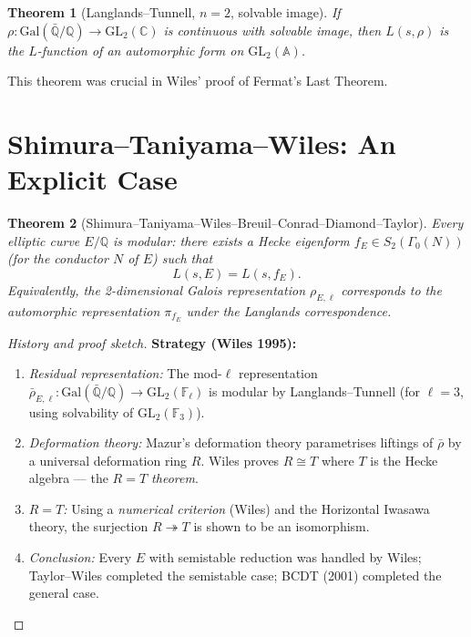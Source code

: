 \documentclass[12pt,a4paper]{amsart}
\newtheorem{theorem}{Theorem}[section]
\theoremstyle{definition}
\newcommand{\Q}{\mathbb{Q}}
\newcommand{\C}{\mathbb{C}}
\newcommand{\F}{\mathbb{F}}
\newcommand{\A}{\mathbb{A}}
\newcommand{\GL}{\mathrm{GL}}
\newcommand{\GQ}{\mathrm{Gal}(\bar{\Q}/\Q)}
\begin{document}
\begin{theorem}[Langlands--Tunnell, $n = 2$, solvable image]
\label{thm:langlands_tunnell}
If $\rho : \GQ \to \GL_2(\C)$ is continuous with solvable image, then
$L(s, \rho)$ is the $L$-function of an automorphic form on $\GL_2(\A)$.
\end{theorem}

This theorem was crucial in Wiles' proof of Fermat's Last Theorem.

\section{Shimura--Taniyama--Wiles: An Explicit Case}

\begin{theorem}[Shimura--Taniyama--Wiles--Breuil--Conrad--Diamond--Taylor]
\label{thm:stw}
Every elliptic curve $E/\Q$ is \emph{modular}: there exists a Hecke eigenform
$f_E \in S_2(\Gamma_0(N))$ (for the conductor $N$ of $E$) such that
\[
  L(s, E) = L(s, f_E).
\]
Equivalently, the 2-dimensional Galois representation $\rho_{E,\ell}$ corresponds
to the automorphic representation $\pi_{f_E}$ under the Langlands correspondence.
\end{theorem}

\begin{proof}[History and proof sketch]
\textbf{Strategy (Wiles 1995):}
\begin{enumerate}[label=\arabic*.]
  \item \emph{Residual representation:} The mod-$\ell$ representation
    $\bar\rho_{E,\ell} : \GQ \to \GL_2(\F_\ell)$ is modular by Langlands--Tunnell
    (for $\ell = 3$, using solvability of $\GL_2(\F_3)$).
  \item \emph{Deformation theory:} Mazur's deformation theory parametrises
    liftings of $\bar\rho$ by a universal deformation ring $R$.  Wiles proves
    $R \cong T$ where $T$ is the Hecke algebra — the \emph{$R = T$ theorem}.
  \item \emph{$R = T$:} Using a \emph{numerical criterion} (Wiles) and the
    Horizontal Iwasawa theory, the surjection $R \twoheadrightarrow T$ is shown
    to be an isomorphism.
  \item \emph{Conclusion:} Every $E$ with semistable reduction was handled by
    Wiles; Taylor--Wiles completed the semistable case; BCDT (2001) completed
    the general case.
\end{enumerate}
\end{proof}
\end{document}
